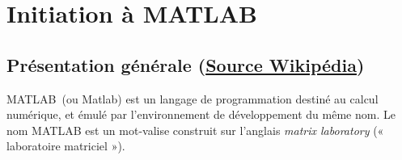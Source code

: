 \chapter{Initiation à MATLAB\label{annexe-matlab}}

\captionsetup{width=0.9\linewidth}
\section[Présentation générale]
        {Présentation générale 
        (\href{https://fr.wikipedia.org/wiki/MATLAB}{Source Wikipédia})}
MATLAB\textregistered~(ou Matlab) est un langage de programmation destiné 
au calcul numérique, et émulé par l'environnement de développement du même nom. 
Le nom MATLAB est un mot-valise construit sur l'anglais \emph{matrix 
laboratory} (« laboratoire matriciel »).


